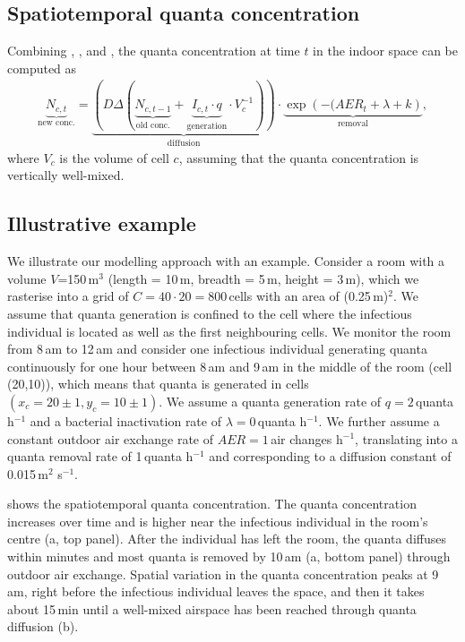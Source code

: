 \documentclass[fleqn,11pt]{wlscirep_supp}
\begin{document}
\subsection{Spatiotemporal quanta concentration}

Combining , , and , the quanta concentration at time $t$ in the indoor space can be computed as
\begin{align}\label{eq:spattemp-N}
    \underbrace{N_{c,t}}_{\text{new conc.}} = \underbrace{\left(D \Delta (\underbrace{N_{c,t-1}}_{\text{old conc.}} + \underbrace{I_{c,t} \cdot q}_{\text{generation}} \cdot V_{c}^{-1})\right)}_{\text{diffusion}} \cdot \underbrace{\exp\left(-(AER_{t} + \lambda + k\right)}_{\text{removal}},
\end{align}
where $V_c$ is the volume of cell $c$, assuming that the quanta concentration is vertically well-mixed.

\subsection{Illustrative example}\label{sec:example}

We illustrate our modelling approach with an example. Consider a room with a volume $V$=150\,m$^3$ (length = 10\,m, breadth = 5\,m, height = 3\,m), which we rasterise into a grid of $C = 40 \cdot 20 = 800$\,cells with an area of (0.25\,m)$^2$. We assume that quanta generation is confined to the cell where the infectious individual is located as well as the first neighbouring cells. We monitor the room from 8\,am to 12\,am and consider one infectious individual generating quanta continuously for one hour between 8\,am and 9\,am in the middle of the room (cell (20,10)), which means that quanta is generated in cells $(x_c = 20\pm1, y_c = 10\pm1)$. We assume a quanta generation rate of $q = 2$\,quanta h$^{-1}$ and a bacterial inactivation rate of $\lambda = 0$\,quanta h$^{-1}$. We further assume a constant outdoor air exchange rate of $AER = 1$\,air changes h$^{-1}$, translating into a quanta removal rate of 1\,quanta h$^{-1}$ and corresponding to a diffusion constant of 0.015\,m$^2$ s$^{-1}$. 

 shows the spatiotemporal quanta concentration. The quanta concentration increases over time and is higher near the infectious individual in the room's centre (a, top panel). After the individual has left the room, the quanta diffuses within minutes and most quanta is removed by 10\,am (a, bottom panel) through outdoor air exchange. Spatial variation in the quanta concentration peaks at 9\,am, right before the infectious individual leaves the space, and then it takes about 15\,min until a well-mixed airspace has been reached through quanta diffusion (b). 
\end{document}

